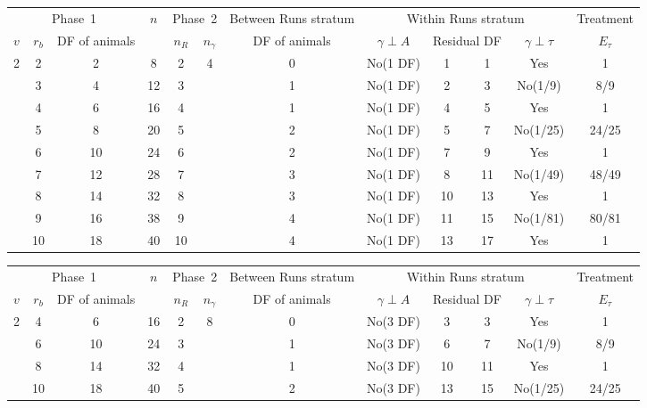 \documentclass[a4paper,11pt]{article}
\begin{document}
\begin{landscape}

\centering
\begin{tabular}[t]{|c|c|c|c|c|c|c|c|c|c|c|c|} \hline
\multicolumn{3}{|c|}{Phase~1}  & $n$  & \multicolumn{2}{c|}{Phase~2} & Between Runs stratum  & \multicolumn{4}{c|}{Within Runs stratum} & Treatment \\ \cline{1-3} \cline{5-6}\cline{7-12}
$v$ & $r_b$ & DF of animals &  & $n_R$ & $n_\gamma$ & DF of animals &  $\gamma \perp A$ & \multicolumn{2}{c|}{Residual DF} & $\gamma \perp \tau$ &  $E_\tau$\\ \hline
2 & 2 & 2 & 8 & 2 & 4 & 0 & No(1 DF)  & 1 & 1 & Yes          & 1 \\ \hline
 &  3 & 4 & 12 & 3 &  & 1 & No(1 DF)  & 2 & 3 & No(1/9)      & 8/9 \\ \hline
 &  4 & 6 & 16 & 4 &  & 1 & No(1 DF)  & 4 & 5 & Yes          & 1 \\ \hline
 &  5 & 8 & 20 & 5 &  & 2 & No(1 DF)  & 5 & 7 & No(1/25)     & 24/25 \\ \hline
 &  6 & 10 & 24 & 6 &  & 2 & No(1 DF) & 7 & 9 & Yes          & 1 \\ \hline
 &  7 & 12 & 28 & 7 &  & 3 & No(1 DF) & 8 & 11 & No(1/49)    & 48/49 \\ \hline
 &  8 & 14 & 32 & 8 &  & 3 & No(1 DF) & 10& 13 & Yes         & 1 \\ \hline
 &  9 & 16 & 38 & 9 &  & 4 & No(1 DF) & 11& 15  & No(1/81)   & 80/81 \\ \hline
 & 10 & 18 & 40 & 10 &  & 4 & No(1 DF)& 13& 17 & Yes         & 1 \\ \hline
\end{tabular}


\begin{tabular}[t]{|c|c|c|c|c|c|c|c|c|c|c|c|} \hline
\multicolumn{3}{|c|}{Phase~1}  & $n$  & \multicolumn{2}{c|}{Phase~2} & Between Runs stratum  & \multicolumn{4}{c|}{Within Runs stratum} & Treatment \\ \cline{1-3} \cline{5-6}\cline{7-12}
$v$ & $r_b$ & DF of animals &  & $n_R$ & $n_\gamma$ & DF of animals &  $\gamma \perp A$ & \multicolumn{2}{c|}{Residual DF} & $\gamma \perp \tau$ &  $E_\tau$\\ \hline
2 & 4 & 6 & 16 & 2 & 8  & 0 & No(3 DF) & 3 &3 & Yes & 1 \\ \hline
 & 6  & 10& 24 & 3 &  & 1 & No(3 DF) & 6   & 7 & No(1/9) & 8/9 \\ \hline
 & 8 & 14 & 32 & 4 &  & 1 & No(3 DF) & 10 &11& Yes  & 1 \\ \hline
 & 10 & 18& 40 & 5 &  & 2 & No(3 DF) & 13 &15 & No(1/25)  & 24/25 \\ \hline
\end{tabular}



\end{landscape}
\end{document}
